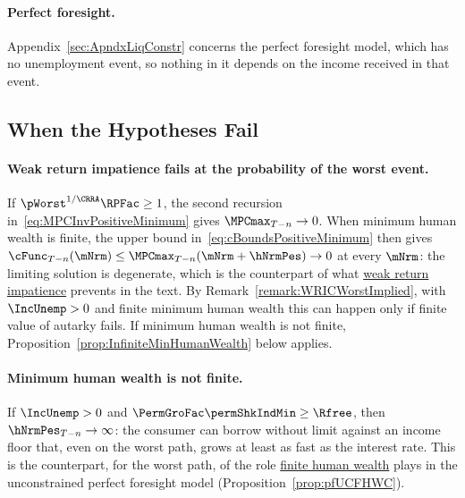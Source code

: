 \documentclass[\econtexRoot/BufferStockTheory]{subfiles}
\begin{document}
\paragraph{Perfect foresight.}
Appendix~\ref{sec:ApndxLiqConstr} concerns the perfect foresight model, which has no unemployment event, so nothing in it depends on the income received in that event.

\subsection{When the Hypotheses Fail}\label{subsec:PositiveMinimumFailures}

\paragraph{Weak return impatience fails at the probability of the worst event.}
If $\pWorst^{1/\CRRA}\RPFac\geq 1$, the second recursion in~\eqref{eq:MPCInvPositiveMinimum} gives $\MPCmax_{T-n}\rightarrow 0$.
When minimum human wealth is finite, the upper bound in~\eqref{eq:cBoundsPositiveMinimum} then gives $\cFunc_{T-n}(\mNrm)\leq\MPCmax_{T-n}(\mNrm+\hNrmPes)\rightarrow 0$ at every $\mNrm$: the limiting solution is degenerate, which is the counterpart of what \hyperlink{WRIC}{weak return impatience} prevents in the text.
By Remark~\ref{remark:WRICWorstImplied}, with $\IncUnemp>0$ and finite minimum human wealth this can happen only if finite value of autarky fails.
If minimum human wealth is not finite, Proposition~\ref{prop:InfiniteMinHumanWealth} below applies.

\paragraph{Minimum human wealth is not finite.}
If $\IncUnemp>0$ and $\PermGroFac\permShkIndMin\geq\Rfree$, then $\hNrmPes_{T-n}\rightarrow\infty$: the consumer can borrow without limit against an income floor that, even on the worst path, grows at least as fast as the interest rate.
This is the counterpart, for the worst path, of the role \hyperlink{FHWC}{finite human wealth} plays in the unconstrained perfect foresight model (Proposition~\ref{prop:pfUCFHWC}).
\end{document}
